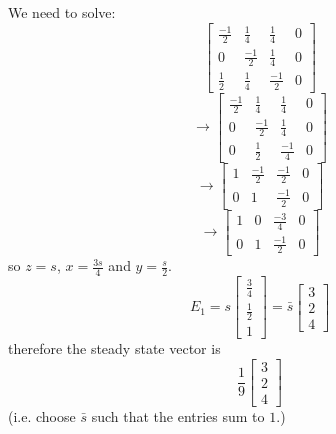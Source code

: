 \documentclass{article}
\begin{document}
\begin{Answer}
We need to solve:
  \begin{equation*}
  \left[
  \begin{array}{ccc|c}
  \frac{-1}{2} & \frac{1}{4} & \frac{1}{4}&0\\
  0 & \frac{-1}{2} & \frac{1}{4}&0\\
  \frac{1}{2} & \frac{1}{4} & \frac{-1}{2}&0
  \end{array}
  \right]
  \end{equation*}
  \begin{equation*}
  \rightarrow\left[
  \begin{array}{ccc|c}
  \frac{-1}{2} & \frac{1}{4} & \frac{1}{4}&0\\
  0 & \frac{-1}{2} & \frac{1}{4}&0\\
  0 & \frac{1}{2} & \frac{-1}{4}&0
  \end{array}
  \right]
  \end{equation*}
  \begin{equation*}
  \rightarrow\left[
  \begin{array}{ccc|c}
  1 & \frac{-1}{2} & \frac{-1}{2}&0\\
  0 & 1 & \frac{-1}{2}&0
  \end{array}
  \right]
  \end{equation*}
  \begin{equation*}
  \rightarrow\left[
  \begin{array}{ccc|c}
  1 & 0 & \frac{-3}{4}&0\\
  0 & 1 & \frac{-1}{2}&0
  \end{array}
  \right]
  \end{equation*}
  so $z = s$, $x = \frac{3s}{4}$ and $y = \frac{s}{2}$.
  \begin{equation*}
  E_1 = s \left[
  \begin{array}{c}
  \frac{3}{4}\\
  \frac{1}{2}\\
  1
  \end{array}
  \right] = \bar{s} \left[
  \begin{array}{c}
  3\\
  2\\
  4
  \end{array}
  \right]
  \end{equation*}
  therefore the steady state vector is
  \begin{equation*}
  \frac{1}{9} \left[
  \begin{array}{c}
  3\\
  2\\
  4
  \end{array}
  \right]
  \end{equation*}
  (i.e. choose $\bar{s}$ such that the entries sum to $1$.)
\end{Answer}
\end{document}
